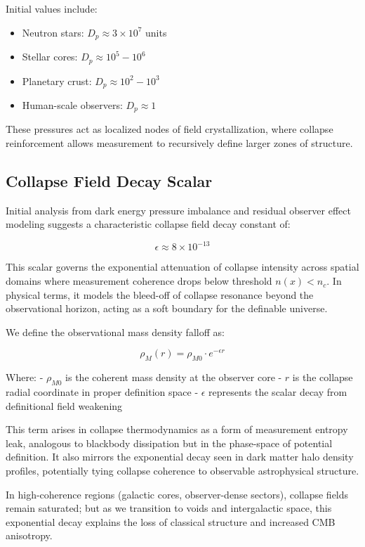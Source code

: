 Initial values include:
\begin{itemize}
  \item Neutron stars: \( D_p \approx 3 \times 10^7 \) units
  \item Stellar cores: \( D_p \approx 10^5 - 10^6 \)
  \item Planetary crust: \( D_p \approx 10^2 - 10^3 \)
  \item Human-scale observers: \( D_p \approx 1 \)
\end{itemize}

These pressures act as localized nodes of field crystallization, where collapse reinforcement allows measurement to recursively define larger zones of structure.

\subsection{Collapse Field Decay Scalar} \cite{quantum_thermo_laws, thermalization_dynamics}

Initial analysis from dark energy pressure imbalance and residual observer effect modeling suggests a characteristic collapse field decay constant of:

\[
\epsilon \approx 8 \times 10^{-13}
\]

This scalar governs the exponential attenuation of collapse intensity across spatial domains where measurement coherence drops below threshold \( n(x) < n_c \). In physical terms, it models the bleed-off of collapse resonance beyond the observational horizon, acting as a soft boundary for the definable universe.

We define the observational mass density falloff as:

\[
\rho_M(r) = \rho_{M0} \cdot e^{-\epsilon r}
\]

Where:
- \( \rho_{M0} \) is the coherent mass density at the observer core
- \( r \) is the collapse radial coordinate in proper definition space
- \( \epsilon \) represents the scalar decay from definitional field weakening

This term arises in collapse thermodynamics as a form of measurement entropy leak, analogous to blackbody dissipation but in the phase-space of potential definition. It also mirrors the exponential decay seen in dark matter halo density profiles, potentially tying collapse coherence to observable astrophysical structure.

In high-coherence regions (galactic cores, observer-dense sectors), collapse fields remain saturated; but as we transition to voids and intergalactic space, this exponential decay explains the loss of classical structure and increased CMB anisotropy.

